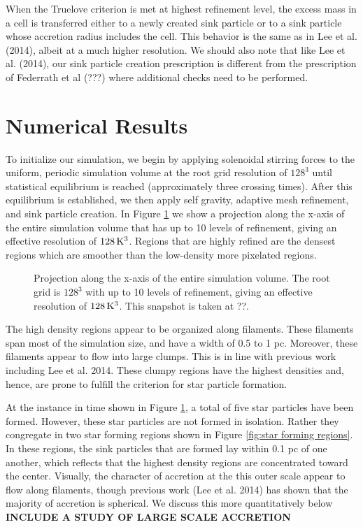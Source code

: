 \documentclass{emulateapj}
\begin{document}
When the Truelove criterion is met at highest refinement level, the excess mass in a cell is transferred either to a newly created sink particle or to a sink particle whose accretion radius includes the cell.  This behavior is the same as in Lee et al. (2014), albeit at a much higher resolution.  We should also note that like Lee et al. (2014), our sink particle creation prescription is different from the prescription of Federrath et al (???) where additional checks need to be performed.


\section{Numerical Results}

To initialize our simulation, we begin by applying solenoidal stirring forces to the uniform, periodic simulation volume at the root grid resolution of $128^3$ until statistical equilibrium is reached (approximately three crossing times).  After this equilibrium is established, we then apply self gravity, adaptive mesh refinement, and sink particle creation.  In Figure \ref{fig:entire projection} we show a projection along the x-axis of the entire simulation volume that has up to 10 levels of refinement, giving an effective resolution of $128\,{\rm K}^3$. Regions that are highly refined are the densest regions which are smoother than the low-density more pixelated regions.
\begin{figure}
\caption{Projection along the x-axis of the entire simulation volume. The root grid is $128^3$ with up to 10 levels of refinement, giving an effective resolution of $128\,{\rm K}^3$. This snapshot is taken at ??. \label{fig:entire projection}}
\end{figure}

The high density regions appear to be organized along filaments.  These filaments span most of the simulation size, and have a width of 0.5 to 1 pc.  Moreover, these filaments appear to flow into large clumps.  This is in line with previous work including Lee et al. 2014. These clumpy regions have the highest densities and, hence, are prone to fulfill the criterion for star particle formation.  

At the instance in time shown in Figure \ref{fig:entire projection}, a total of five star particles have been formed.  However, these star particles are not formed in isolation.  Rather they congregate in two star forming regions shown in Figure \ref{fig:star forming regions}.  In these regions, the sink particles that are formed lay within 0.1 pc of one another, which reflects that the highest density regions are concentrated toward the center.  Visually, the character of accretion at the this outer scale appear to flow along filaments, though previous work (Lee et al. 2014) has shown that the majority of accretion is spherical.  We discuss this more quantitatively below {\bf INCLUDE A STUDY OF LARGE SCALE ACCRETION}
\end{document}
